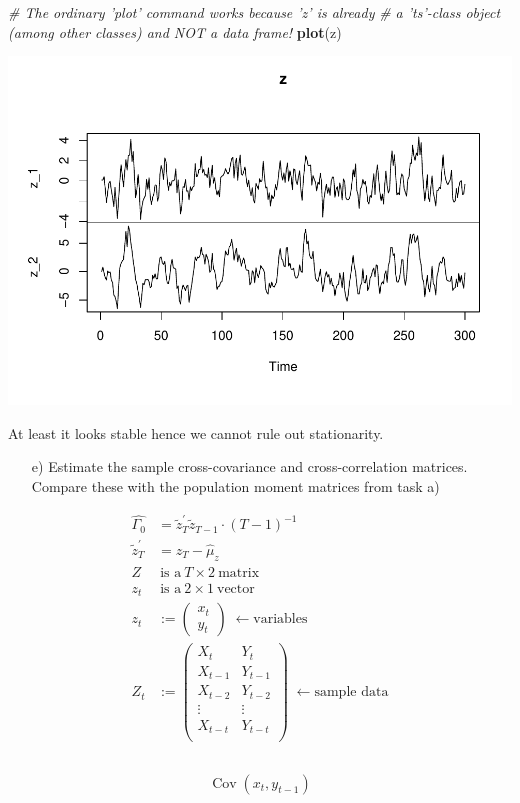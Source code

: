 \documentclass[12pt,a4paper]{article}
\newcommand{\Cov}{\operatorname{Cov}}
\newenvironment{Shaded}{\begin{snugshade}}{\end{snugshade}}
\newcommand{\CommentTok}[1]{\textcolor[rgb]{0.56,0.35,0.01}{\textit{#1}}}
\newcommand{\KeywordTok}[1]{\textcolor[rgb]{0.13,0.29,0.53}{\textbf{#1}}}
\newcommand{\NormalTok}[1]{#1}
\begin{document}
\begin{Shaded}
\begin{Highlighting}[]
\CommentTok{# The ordinary 'plot' command works because 'z' is already }
\CommentTok{# a 'ts'-class object (among other classes) and NOT a data frame!}
\KeywordTok{plot}\NormalTok{(z)}
\end{Highlighting}
\end{Shaded}

\includegraphics{exercise_2_files/figure-latex/unnamed-chunk-8-1.pdf}

At least it looks stable hence we cannot rule out stationarity.

\begin{itemize}
  \item[e)] Estimate the sample cross-covariance and cross-correlation matrices. Compare these with the population moment matrices from task a)
\end{itemize}

\begin{align*}
  \widehat{\Gamma_0} & = \tilde{z}_T^{'} \tilde{z}_{T-1} \cdot (T - 1)^{-1} \\
  \tilde{z}_T^{'} & = z_T - \widehat{\mu}_z\\
  Z & \ \text{is a} \ T \times 2 \ \text{matrix}\\
  z_t &\  \text{is a} \ 2 \times 1 \ \text{vector}\\
  z_t & := 
  \begin{pmatrix}
    x_t \\
    y_t
  \end{pmatrix} \; \leftarrow \text{variables}\\
  Z_t & := 
  \begin{pmatrix}
    X_{t} & Y_{t} \\
    X_{t-1} & Y_{t-1} \\
    X_{t-2} & Y_{t-2} \\
    \vdots & \vdots \\
    X_{t-t} & Y_{t-t} \\
  \end{pmatrix} \; \leftarrow \text{sample data}\\
\end{align*}

\begin{align*}
  \widehat{\Cov(x_t, y_{t-1})}
\end{align*}
\end{document}
